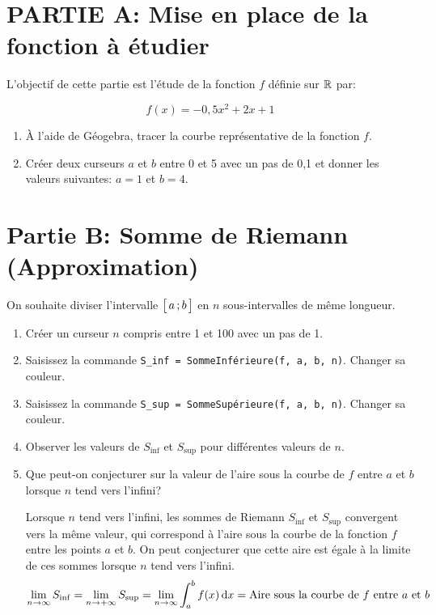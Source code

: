 \documentclass[11pt, a4paper]{report}
\begin{document}
\def\level{BTS}  %
\def\course{CIEL 1}
\def\chaptername{Intégration} %
\def\docname{C107~--~TP1}        %

\pagestyle{DS_FP}

\NomPrenomNote{}


\section*{PARTIE A\@: Mise en place de la fonction à étudier}
\medskip

L'objectif de cette partie est l'étude de la fonction $f$ définie sur $\mathbb{R}$ par:

\[f(x)=-0,5x^2+2x+1\]


\begin{enumerate}
    \item À l'aide de Géogebra, tracer la courbe représentative de la fonction $f$. 
    \item Créer deux curseurs $a$ et $b$ entre 0 et 5 avec un pas de 0,1 et donner les valeurs suivantes: $a=1$ et $b=4$. 
\end{enumerate}

\section*{Partie B\@: Somme de Riemann (Approximation)}

On souhaite diviser l'intervalle $\bigl[ \, a \, ; b \,\bigl]$ en $n$ sous-intervalles de même longueur. 

\begin{enumerate}
    \item Créer un curseur $n$ compris entre 1 et 100 avec un pas de 1. 
    \item Saisissez la commande \verb|S_inf = SommeInférieure(f, a, b, n)|. Changer sa couleur.
    \item Saisissez la commande \verb|S_sup = SommeSupérieure(f, a, b, n)|. Changer sa couleur.
    \item Observer les valeurs de $S_{\inf}$ et $S_{\sup}$ pour différentes valeurs de $n$.  
    \item Que peut-on conjecturer sur la valeur de l'aire sous la courbe de $f$ entre $a$ et $b$ lorsque $n$ tend vers l'infini? 
    \begin{blocvisible}[height=3]
                Lorsque $n$ tend vers l'infini, les sommes de Riemann $S_{\inf}$ et $S_{\sup}$ convergent vers la même valeur, qui correspond à l'aire sous la courbe de la fonction $f$ entre les points $a$ et $b$. On peut conjecturer que cette aire est égale à la limite de ces sommes lorsque $n$ tend vers l'infini.
                \[\lim_{n \to \infty} S_{\inf} = \lim_{n \to +\infty} S_{\sup} = \lim_{n \to \infty} \int_{a}^{b} f(x) \,\mathrm{d}x= \text{Aire sous la courbe de } f \text{ entre } a \text{ et } b\]        
    \end{blocvisible}     
\end{enumerate}
\end{document}
